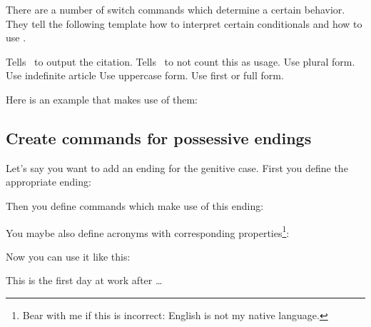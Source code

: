 \documentclass{acro-manual}
\begin{document}
There are a number of switch commands which determine a certain behavior.
They tell the following template how to interpret certain conditionals and how
to use .
\begin{commands}
    Tells \acro\ to output the citation.
    Tells \acro\ to not count this as usage.
    Use plural form.
    Use indefinite article
    Use uppercase form.
    Use first or full form.
\end{commands}

Here is an example that makes use of them:
\begin{sourcecode}
  \NewAcroCommand{}
\end{sourcecode}

\subsection{Create commands for possessive endings}
Let's say you want to add an ending for the genitive case.
First you define the appropriate ending:
\begin{sourcecode}
\end{sourcecode}
Then you define commands which make use of this ending:
\begin{sourcecode}
  \NewAcroCommand{}
  \NewAcroCommand{}
  \NewAcroCommand{}
  \NewAcroCommand{}
  \NewAcroCommand{}
\end{sourcecode}
You maybe also define acronyms with corresponding properties\footnote{Bear
  with me if this is incorrect: English is not my native language.}:
\begin{sourcecode}
\end{sourcecode}
Now you can use it like this:
\begin{example}
  This is the  first day at work after \dots
\end{example}
\end{document}
